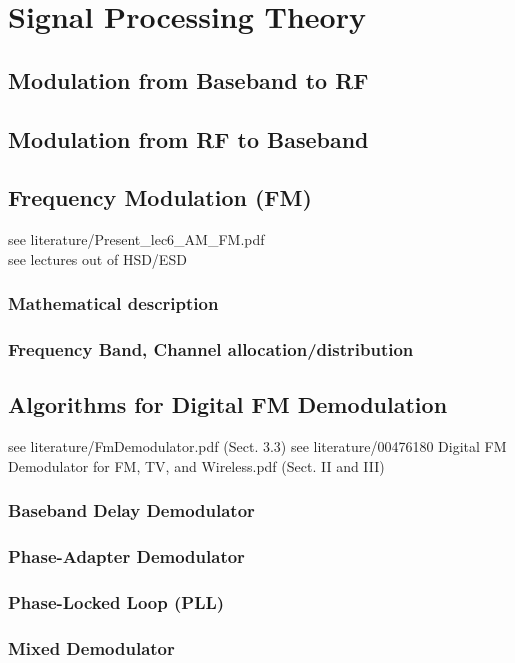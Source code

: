 \chapter{Signal Processing Theory}
\label{cha:TheThesis}

  \section{Modulation from Baseband to RF}
  \section{Modulation from RF to Baseband}

  \section{Frequency Modulation (FM)}
  see literature/Present\_lec6\_AM\_FM.pdf\\
  see lectures out of HSD/ESD
    \subsection{Mathematical description}
    \subsection{Frequency Band, Channel allocation/distribution}

  \section{Algorithms for Digital FM Demodulation}
    see literature/FmDemodulator.pdf (Sect. 3.3)
    see literature/00476180 Digital FM Demodulator for FM, TV, and Wireless.pdf (Sect. II and III)

    \subsection{Baseband Delay Demodulator}
    \subsection{Phase-Adapter Demodulator}
    \subsection{Phase-Locked Loop (PLL)}
    \subsection{Mixed Demodulator}



